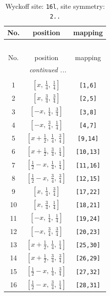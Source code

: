 \documentclass[fleqn,8pt]{jsarticle}
\begin{document}
\renewcommand{\arraystretch}{1.2}
\begin{longtable}{ccc}
\caption{Wyckoff site: {\tt 16l}, site symmetry: {\tt 2..}}
 \\
 \hline \hline
No. & position & mapping \\ \hline \endfirsthead

\multicolumn{2}{l}{\tablename\ \thetable{}} \\
 \hline \hline
No. & position & mapping \\ \hline \endhead

 \hline \hline
\multicolumn{2}{r}{\footnotesize\it continued ...} \\ \endfoot

 \hline \hline
\multicolumn{2}{r}{} \\ \endlastfoot

1 & $\left[ x,\, \frac{1}{4},\, \frac{1}{4} \right]$ & {\tt [1,6]} \\ \hline
2 & $\left[ x,\, \frac{3}{4},\, \frac{3}{4} \right]$ & {\tt [2,5]} \\ \hline
3 & $\left[ - x,\, \frac{1}{4},\, \frac{3}{4} \right]$ & {\tt [3,8]} \\ \hline
4 & $\left[ - x,\, \frac{3}{4},\, \frac{1}{4} \right]$ & {\tt [4,7]} \\ \hline
5 & $\left[ x + \frac{1}{2},\, \frac{1}{4},\, \frac{3}{4} \right]$ & {\tt [9,14]} \\ \hline
6 & $\left[ x + \frac{1}{2},\, \frac{3}{4},\, \frac{1}{4} \right]$ & {\tt [10,13]} \\ \hline
7 & $\left[ \frac{1}{2} - x,\, \frac{1}{4},\, \frac{1}{4} \right]$ & {\tt [11,16]} \\ \hline
8 & $\left[ \frac{1}{2} - x,\, \frac{3}{4},\, \frac{3}{4} \right]$ & {\tt [12,15]} \\ \hline
9 & $\left[ x,\, \frac{1}{4},\, \frac{3}{4} \right]$ & {\tt [17,22]} \\ \hline
10 & $\left[ x,\, \frac{3}{4},\, \frac{1}{4} \right]$ & {\tt [18,21]} \\ \hline
11 & $\left[ - x,\, \frac{1}{4},\, \frac{1}{4} \right]$ & {\tt [19,24]} \\ \hline
12 & $\left[ - x,\, \frac{3}{4},\, \frac{3}{4} \right]$ & {\tt [20,23]} \\ \hline
13 & $\left[ x + \frac{1}{2},\, \frac{1}{4},\, \frac{1}{4} \right]$ & {\tt [25,30]} \\ \hline
14 & $\left[ x + \frac{1}{2},\, \frac{3}{4},\, \frac{3}{4} \right]$ & {\tt [26,29]} \\ \hline
15 & $\left[ \frac{1}{2} - x,\, \frac{1}{4},\, \frac{3}{4} \right]$ & {\tt [27,32]} \\ \hline
16 & $\left[ \frac{1}{2} - x,\, \frac{3}{4},\, \frac{1}{4} \right]$ & {\tt [28,31]} \\
\end{longtable}
\end{document}
